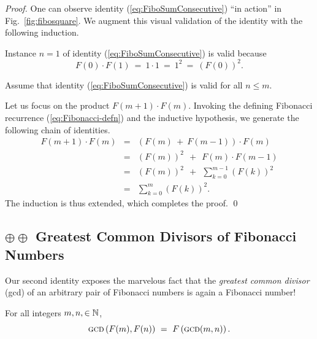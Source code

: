 \begin{proof}
One can observe identity (\ref{eq:FiboSumConsecutive}) ``in action''
in Fig.~\ref{fig:fibosquare}.  We augment this visual validation of
the identity with the following induction.

\medskip

Instance $n=1$ of identity (\ref{eq:FiboSumConsecutive}) is valid
because
\[ F(0) \cdot F(1) \ = \ 1 \cdot 1 \ = \ 1^2 \ = \ (F(0))^2. \]

\medskip

Assume that identity (\ref{eq:FiboSumConsecutive}) is valid for all $n
\leq m$.

\medskip

Let us focus on the product $F(m+1) \cdot F(m)$.  Invoking the defining Fibonacci recurrence
(\ref{eq:Fibonacci-defn}) and the inductive hypothesis, we generate the following chain of identities.
\begin{eqnarray*}
F(m+1) \cdot F(m)
 & = &
   (F(m) \ + \ F(m-1)) \cdot F(m) \\
 & = &
   (F(m))^2 \ \ + \ \ F(m) \cdot F(m-1)  \\
 & = & 
   (F(m))^2  \ \ + \ \ \sum_{k=0}^{m-1} (F(k))^2  \\
 & = &
   \sum_{k=0}^{m} (F(k))^2.
\end{eqnarray*}
The induction is thus extended, which completes the proof.
\qed
\end{proof}



\subsection{$\oplus \oplus$ Greatest Common Divisors of Fibonacci Numbers}
\label{Appendix:FiboGCD}

Our second identity exposes the marvelous fact that the {\em greatest common divisor} ({\sc gcd}) of an arbitrary pair of Fibonacci numbers is again a Fibonacci number!

\begin{prop}
For all integers $m, n, \in \mathbb{N}$,
\begin{equation}
\label{eq:fibo-gcd}
\mbox{\sc gcd} \left(F(m), F(n) \right) \ = \ F \left(\mbox{\sc gcd}(m, n) \right).
\end{equation}
\end{prop}

\medskip

